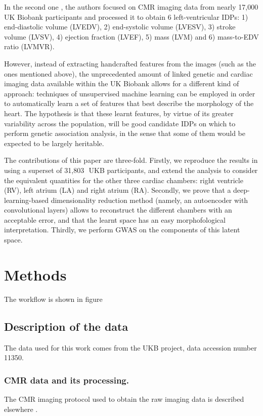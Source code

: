 \documentclass[twocolumn]{llncs}
\newcommand{\NCMR}{31,803\,} %
\newcommand{\ACCESSIONNUMBER}{11350}
\begin{document}
In the second one \cite{ref_nayaung}, the authors focused on CMR imaging data from nearly 17,000 UK Biobank participants and processed it to obtain 6 left-ventricular IDPs: 1) end-diastolic volume (LVEDV), 2) end-systolic volume (LVESV), 3) stroke volume (LVSV), 4) ejection fraction (LVEF), 5) mass (LVM) and 6) mass-to-EDV ratio (LVMVR).

However, instead of extracting handcrafted features from the images (such as the ones mentioned above), the unprecedented amount of linked genetic and cardiac imaging data available within the UK Biobank allows for a different kind of approach: techniques of unsupervised machine learning can be employed in order to automatically learn a set of features that best describe the morphology of the heart. 
The hypothesis is that these learnt features, by virtue of its greater variability across the population, will be good candidate IDPs on which to perform genetic association analysis, in the sense that some of them would be expected to be largely heritable.

The contributions of this paper are three-fold. Firstly, we reproduce the results in \cite{ref_nayaung} using a superset of \NCMR\, UKB participants, and extend the analysis to consider the equivalent quantities for the other three cardiac chambers: right ventricle (RV), left atrium (LA) and right atrium (RA).
Secondly, we prove that a deep-learning-based dimensionality reduction method (namely, an autoencoder with convolutional layers) allows to reconstruct the different chambers with an acceptable error, and that the learnt space has an easy morphofological interpretation. Thirdly, we perform GWAS on the components of this latent space.

\section{Methods}
The workflow is shown in figure%


\subsection{Description of the data}
The data used for this work comes from the UKB project, data accession number \ACCESSIONNUMBER.

\subsubsection{CMR data and its processing.}
The CMR imaging protocol used to obtain the raw imaging data is described elsewhere \cite{ref_ukbb_cmr}. 
\end{document}
